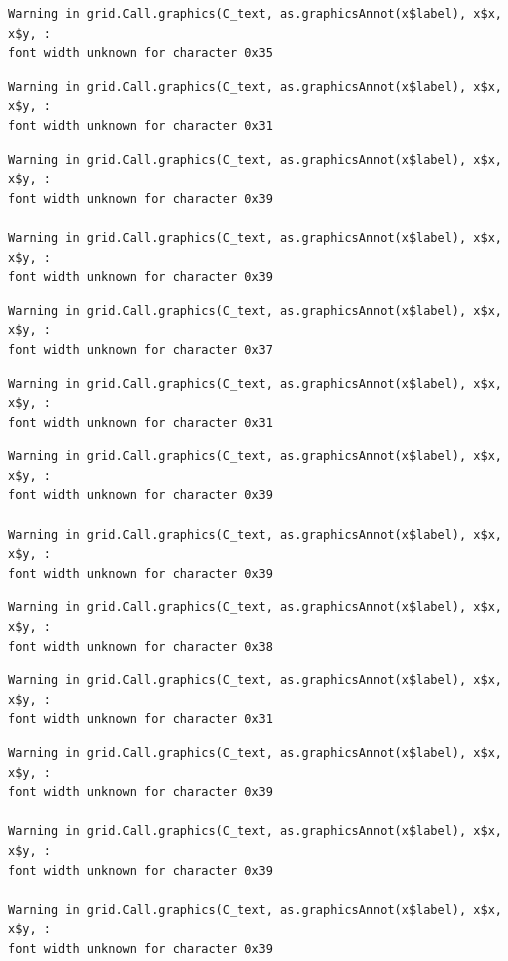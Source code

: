 \documentclass[
  letterpaper,
  DIV=11,
  numbers=noendperiod]{scrreprt}
\begin{document}
\begin{verbatim}
Warning in grid.Call.graphics(C_text, as.graphicsAnnot(x$label), x$x, x$y, :
font width unknown for character 0x35
\end{verbatim}

\begin{verbatim}
Warning in grid.Call.graphics(C_text, as.graphicsAnnot(x$label), x$x, x$y, :
font width unknown for character 0x31
\end{verbatim}

\begin{verbatim}
Warning in grid.Call.graphics(C_text, as.graphicsAnnot(x$label), x$x, x$y, :
font width unknown for character 0x39

Warning in grid.Call.graphics(C_text, as.graphicsAnnot(x$label), x$x, x$y, :
font width unknown for character 0x39
\end{verbatim}

\begin{verbatim}
Warning in grid.Call.graphics(C_text, as.graphicsAnnot(x$label), x$x, x$y, :
font width unknown for character 0x37
\end{verbatim}

\begin{verbatim}
Warning in grid.Call.graphics(C_text, as.graphicsAnnot(x$label), x$x, x$y, :
font width unknown for character 0x31
\end{verbatim}

\begin{verbatim}
Warning in grid.Call.graphics(C_text, as.graphicsAnnot(x$label), x$x, x$y, :
font width unknown for character 0x39

Warning in grid.Call.graphics(C_text, as.graphicsAnnot(x$label), x$x, x$y, :
font width unknown for character 0x39
\end{verbatim}

\begin{verbatim}
Warning in grid.Call.graphics(C_text, as.graphicsAnnot(x$label), x$x, x$y, :
font width unknown for character 0x38
\end{verbatim}

\begin{verbatim}
Warning in grid.Call.graphics(C_text, as.graphicsAnnot(x$label), x$x, x$y, :
font width unknown for character 0x31
\end{verbatim}

\begin{verbatim}
Warning in grid.Call.graphics(C_text, as.graphicsAnnot(x$label), x$x, x$y, :
font width unknown for character 0x39

Warning in grid.Call.graphics(C_text, as.graphicsAnnot(x$label), x$x, x$y, :
font width unknown for character 0x39

Warning in grid.Call.graphics(C_text, as.graphicsAnnot(x$label), x$x, x$y, :
font width unknown for character 0x39
\end{verbatim}
\end{document}
